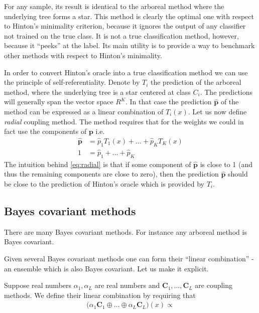 \documentclass[twoside,11pt]{article}
\begin{document}
For any sample, its result is identical to the arboreal method where the underlying tree forms a star. This method is clearly the optimal one with respect to Hinton's minimality criterion, because it ignores the output of any classifier not trained on the true class. It is not a true classification method, however, because it ``peeks'' at the label. Its main utility is to provide a way to benchmark other methods with respect to Hinton's minimality.

In order to convert Hinton's oracle into a true classification method we can use the principle of self-referentiality.  Denote by ${T}_i$ the prediction of the arboreal method, where the underlying tree is a star centered at class $C_i$. The predictions will generally span the vector space $R^K$. In that case the prediction $\hat{\boldsymbol{p}}$ of the method  can be expressed as a linear combination of $T_i(x)$. Let us now define \emph{radial} coupling method. The  method requires that for the  weights we could in fact use the components of $\boldsymbol{p}$ i.e.
\begin{equation}
	\begin{split}
	\hat {\boldsymbol{p}} &= \hat p_1 T_1(x) + \ldots + \hat p_K T_K(x)\\
	1 &= \hat p_1 + \ldots + \hat p_K
	\end{split}
	 \label{eq:radial}
\end{equation}
%
The intuition behind \eqref{eq:radial} is that if some component of $\hat{\boldsymbol{p}}$ is close to 1 (and thus the remaining components are close to zero), then the prediction $\hat{\boldsymbol{p}}$ should be close to the prediction of Hinton's oracle which is provided by ${{T}}_i$.

\subsection{Bayes covariant methods}

There are many Bayes covariant methods. For instance any arboreal method is Bayes covariant. 



Given several Bayes covariant methods one can form  their ``linear combination'' - an ensemble which is also Bayes covariant. Let us make it explicit.

 Suppose real numbers $\alpha_1, \alpha_L$ are real numbers and $\boldsymbol{C}_1, \ldots, \boldsymbol{C}_L$ are coupling methods. We define their linear combination by requiring that 
 \begin{align*}
 	\bigl(\alpha_1 \boldsymbol{C}_1 \oplus \ldots \oplus \alpha_L \boldsymbol{C}_L\bigr)(x) \propto 
 \end{align*}
 
\end{document}
